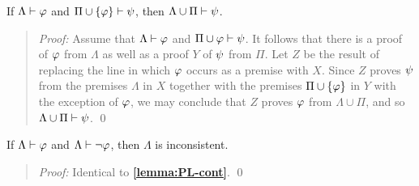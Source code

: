 \begin{Lthm} \label{lemma:FOL-prcut}
  If $\Lambda \vdash \varphi$ and $\Pi\cup\lbrace\varphi\rbrace \vdash \psi$, then $\Lambda\cup\Pi \vdash \psi$. 
\end{Lthm}

\begin{quote} 
  \textit{Proof:} Assume that $\Lambda \vdash \varphi$ and $\Pi\cup{\ensuremath{\varphi}} \vdash \psi$.
  It follows that there is a proof of $\varphi$ from $\Lambda$ as well as a proof $Y$ of $\psi$ from $\Pi$. 
  Let $Z$ be the result of replacing the line in which $\varphi$ occurs as a premise with $X$.
  Since $Z$ proves $\psi$ from the premises $\Lambda$ in $X$ together with the premises $\Pi\cup\lbrace\varphi\rbrace$ in $Y$ with the exception of $\varphi$, we may conclude that $Z$ proves $\varphi$ from $\Lambda\cup\Pi$, and so $\Lambda\cup\Pi\vdash\psi$.
  \qed
\end{quote}









\begin{Lthm} \label{lemma:FOL-cont}
  If $\Lambda\vdash\varphi$ and $\Lambda\vdash\neg\varphi$, then $\Lambda$ is inconsistent. 
\end{Lthm}

\begin{quote} 
  \textit{Proof:} 
  Identical to \textbf{\ref{lemma:PL-cont}}.
  \qed
\end{quote}
  





